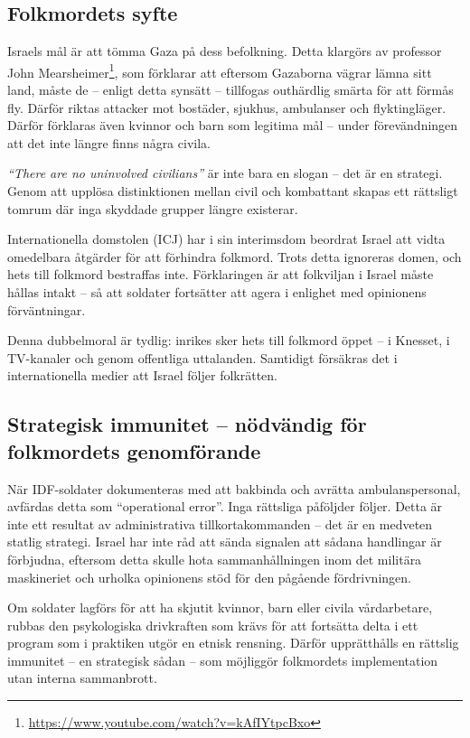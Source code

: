\documentclass[12pt]{article}
\begin{document}
\subsection{Folkmordets syfte}

Israels mål är att tömma Gaza på dess befolkning. Detta klargörs av professor John Mearsheimer\footnote{\url{https://www.youtube.com/watch?v=kAfIYtpcBxo}}, som förklarar att eftersom Gazaborna vägrar lämna sitt land, måste de – enligt detta synsätt – tillfogas outhärdlig smärta för att förmås fly. Därför riktas attacker mot bostäder, sjukhus, ambulanser och flyktingläger. Därför förklaras även kvinnor och barn som legitima mål – under förevändningen att det inte längre finns några civila.

\textit{“There are no uninvolved civilians”} är inte bara en slogan – det är en strategi. Genom att upplösa distinktionen mellan civil och kombattant skapas ett rättsligt tomrum där inga skyddade grupper längre existerar.

Internationella domstolen (ICJ) har i sin interimsdom beordrat Israel att vidta omedelbara åtgärder för att förhindra folkmord. Trots detta ignoreras domen, och hets till folkmord bestraffas inte. Förklaringen är att folkviljan i Israel måste hållas intakt – så att soldater fortsätter att agera i enlighet med opinionens förväntningar.

Denna dubbelmoral är tydlig: inrikes sker hets till folkmord öppet – i Knesset, i TV-kanaler och genom offentliga uttalanden. Samtidigt försäkras det i internationella medier att Israel följer folkrätten.


\subsection{Strategisk immunitet – nödvändig för folkmordets genomförande}

När IDF-soldater dokumenteras med att bakbinda och avrätta ambulanspersonal, avfärdas detta som \enquote{operational error}. Inga rättsliga påföljder följer. Detta är inte ett resultat av administrativa tillkortakommanden – det är en medveten statlig strategi. Israel har inte råd att sända signalen att sådana handlingar är förbjudna, eftersom detta skulle hota sammanhållningen inom det militära maskineriet och urholka opinionens stöd för den pågående fördrivningen.

Om soldater lagförs för att ha skjutit kvinnor, barn eller civila vårdarbetare, rubbas den psykologiska drivkraften som krävs för att fortsätta delta i ett program som i praktiken utgör en etnisk rensning. Därför upprätthålls en rättslig immunitet – en strategisk sådan – som möjliggör folkmordets implementation utan interna sammanbrott.
\end{document}
